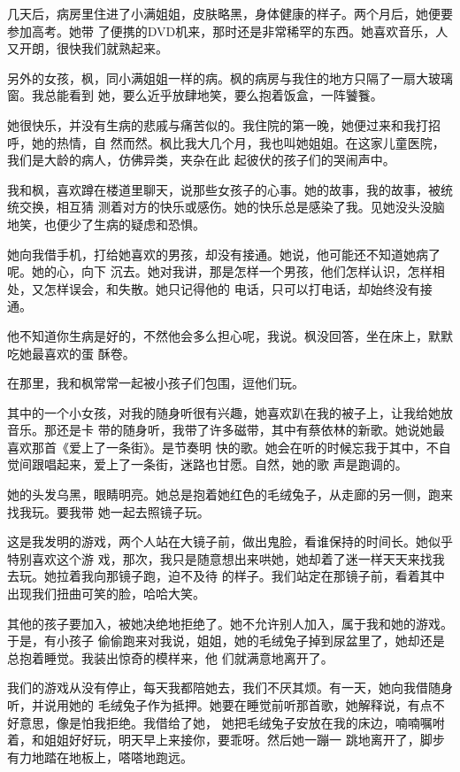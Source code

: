 		几天后，病房里住进了小满姐姐，皮肤略黑，身体健康的样子。两个月后，她便要参加高考。她带
	了便携的DVD机来，那时还是非常稀罕的东西。她喜欢音乐，人又开朗，很快我们就熟起来。


		另外的女孩，枫，同小满姐姐一样的病。枫的病房与我住的地方只隔了一扇大玻璃窗。我总能看到
	她，要么近乎放肆地笑，要么抱着饭盒，一阵饕餮。

		她很快乐，并没有生病的悲戚与痛苦似的。我住院的第一晚，她便过来和我打招呼，她的热情，自
	然而然。枫比我大几个月，我也叫她姐姐。在这家儿童医院，我们是大龄的病人，仿佛异类，夹杂在此
	起彼伏的孩子们的哭闹声中。


		我和枫，喜欢蹲在楼道里聊天，说那些女孩子的心事。她的故事，我的故事，被统统交换，相互猜
	测着对方的快乐或感伤。她的快乐总是感染了我。见她没头没脑地笑，也便少了生病的疑虑和恐惧。


		她向我借手机，打给她喜欢的男孩，却没有接通。她说，他可能还不知道她病了呢。她的心，向下
	沉去。她对我讲，那是怎样一个男孩，他们怎样认识，怎样相处，又怎样误会，和失散。她只记得他的
	电话，只可以打电话，却始终没有接通。


		他不知道你生病是好的，不然他会多么担心呢，我说。枫没回答，坐在床上，默默吃她最喜欢的蛋
	酥卷。


		在那里，我和枫常常一起被小孩子们包围，逗他们玩。


		其中的一个小女孩，对我的随身听很有兴趣，她喜欢趴在我的被子上，让我给她放音乐。那还是卡
	带的随身听，我带了许多磁带，其中有蔡依林的新歌。她说她最喜欢那首《爱上了一条街》。是节奏明
	快的歌。她会在听的时候忘我于其中，不自觉间跟唱起来，爱上了一条街，迷路也甘愿。自然，她的歌
	声是跑调的。


		她的头发乌黑，眼睛明亮。她总是抱着她红色的毛绒兔子，从走廊的另一侧，跑来找我玩。要我带
	她一起去照镜子玩。

		这是我发明的游戏，两个人站在大镜子前，做出鬼脸，看谁保持的时间长。她似乎特别喜欢这个游
	戏，那次，我只是随意想出来哄她，她却着了迷一样天天来找我去玩。她拉着我向那镜子跑，迫不及待
	的样子。我们站定在那镜子前，看着其中出现我们扭曲可笑的脸，哈哈大笑。


		其他的孩子要加入，被她决绝地拒绝了。她不允许别人加入，属于我和她的游戏。于是，有小孩子
	偷偷跑来对我说，姐姐，她的毛绒兔子掉到尿盆里了，她却还是总抱着睡觉。我装出惊奇的模样来，他
	们就满意地离开了。

		我们的游戏从没有停止，每天我都陪她去，我们不厌其烦。有一天，她向我借随身听，并说用她的
	毛绒兔子作为抵押。她要在睡觉前听那首歌，她解释说，有点不好意思，像是怕我拒绝。我借给了她，
	她把毛绒兔子安放在我的床边，喃喃嘱咐着，和姐姐好好玩，明天早上来接你，要乖呀。然后她一蹦一
	跳地离开了，脚步有力地踏在地板上，嗒嗒地跑远。

